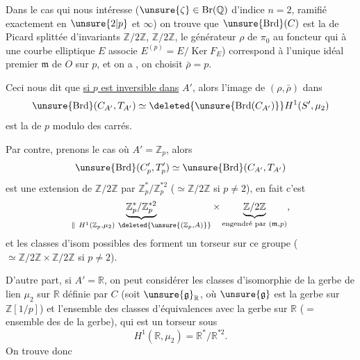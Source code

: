 
Dans le cas qui nous intéresse ($\unsure{\zeta}\in\mathrm{Br}(\mathbb Q)$ d'indice $n=2$, ramifié exactement en $\unsure{2|p}$ et $\infty$) 
on trouve que $\unsure{\operatorname{Brd}}(C)$ est la   de Picard splittée d'invariants $\mathbb Z/2\mathbb Z$, $\mathbb Z/2\mathbb Z$, le générateur $\rho$ de $\pi_0$  au  foncteur qui à une courbe elliptique $E$ associe $E^{(p)}=E/\operatorname{Ker}F_E$)
correspond à l'unique idéal premier $\mathfrak m$ de $O$ sur $p$, et on a
, on choisit $\bar\rho=p$.

Ceci nous dit que \uline{si $p$ est inversible dans} $A'$, alors l'image de $(\rho,\bar\rho)$ dans
\[
\unsure{\operatorname{Brd}}(C_{A'},T_{A'})
\simeq\deleted{\unsure{\operatorname{Brd}(C_{A'})}}
H^1(S',\mu_2)
\]
est la  de $p$ modulo des carrés.

Par contre, prenons le cas où $A'=\mathbb Z_p$, alors
\[
\unsure{\operatorname{Brd}}(C'_p,T'_p)
\simeq\unsure{\operatorname{Brd}}(C_{A'},T_{A'})
\]
est une extension de $\mathbb Z/2\mathbb Z$ par
$\mathbb Z_p^*/\mathbb Z_p^{*2}$
($\simeq\mathbb Z/2\mathbb Z$ si $p\ne2$), en fait c'est
\[
\underbrace{\mathbb Z_p^*/\mathbb Z_p^{*2}}_
{\parallel\ H^1(\mathbb Z_p,\mu_2)\ \deleted{\unsure{(\mathbb Z_p,A)}}}
\times
\underbrace{\mathbb Z/2\mathbb Z}_{\text{engendré par }(\mathfrak m,p)},
\]
et les classes d'isom possibles des 
forment un torseur sur ce groupe
(
$\simeq\mathbb Z/2\mathbb Z\times\mathbb Z/2\mathbb Z$ si $p\ne2$).

D'autre part, si $A'=\mathbb R$, on peut considérer les classes d'isomorphie de la gerbe de lien $\mu_2$ sur $\mathbb R$ définie par $C$ (soit $\unsure{\mathfrak g}_{\mathbb R}$, où $\unsure{\mathfrak g}$ est la gerbe sur $\mathbb Z[1/p]$) et l'ensemble des classes d'équivalences avec la gerbe  sur $\mathbb R$ ($=$ ensemble des \uline{} de la gerbe), qui est un torseur sous
\[
H^1(\mathbb R,\mu_2)=\mathbb R^*/\mathbb R^{*2}.
\]
On trouve donc
